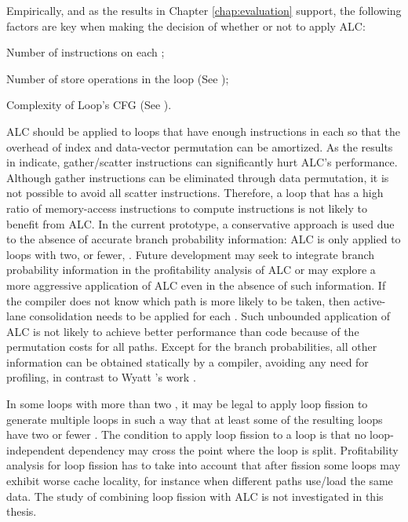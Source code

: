 Empirically, and as the results in Chapter \ref{chap:evaluation} support, the following factors are key when making the decision of whether or not to apply ALC:
\begin{inparaenum}
    \item Number of instructions on each \cpath;
    \item Number of store operations in the loop (See );
    \item Complexity of Loop's CFG (See ).
\end{inparaenum}
ALC should be applied to loops that have enough instructions in each \cpath so that the overhead of index and data-vector permutation can be amortized.
As the results in  indicate, gather/scatter instructions can significantly hurt ALC's performance.
Although gather instructions can be eliminated through data permutation, it is not possible to avoid all scatter instructions.
Therefore, a loop that has a high ratio of memory-access instructions to compute instructions is not likely to benefit from ALC.
In the current prototype, a conservative approach is used due to the absence of accurate branch probability information: ALC is only applied to loops with two, or fewer, \cpaths.
Future development may seek to integrate branch probability information in the profitability analysis of ALC or may explore a more aggressive application of ALC even in the absence of such information.
If the compiler does not know which path is more likely to be taken, then active-lane consolidation needs to be applied for each \cpath.
Such unbounded application of ALC is not likely to achieve better performance than \ifconverted code because of the permutation costs for all paths. 
Except for the branch probabilities, all other information can be obtained statically by a compiler, avoiding any need for profiling, in contrast to Wyatt \etal's work \cite{praharenka_vectorizing_2022}.

In some loops with more than two \cpaths, it may be legal to apply loop fission to generate multiple loops in such a way that at least some of the resulting loops have two or fewer \cpaths.
The condition to apply loop fission to a loop is that no loop-independent dependency may cross the point where the loop is split.
Profitability analysis for loop fission has to take into account that after fission some loops may exhibit worse cache locality, for instance when different paths use/load the same data.
The study of combining loop fission with ALC is not investigated in this thesis.

